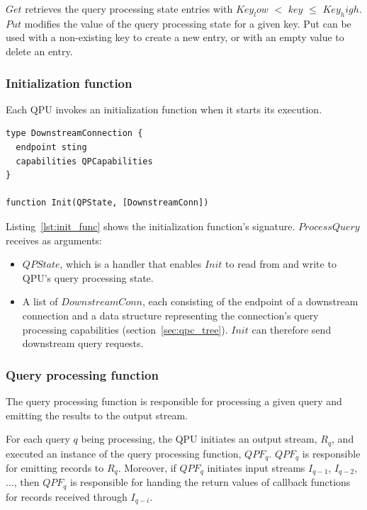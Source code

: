$Get$ retrieves the query processing state entries with $Key_low$ $<$ $key$ $\leq$ $Key_high$.
$Put$ modifies the value of the query processing state for a given key.
Put can be used with a non-existing key to create a new entry, or with an empty value to delete an entry.


\subsubsection{Initialization function}
\label{sec:initialization_func}

Each QPU invokes an initialization function when it starts its execution.

\begin{lstlisting}[caption={Initialization function signature},captionpos=b,label={lst:init_func}]
type DownstreamConnection {
  endpoint sting
  capabilities QPCapabilities
}

function Init(QPState, [DownstreamConn])
\end{lstlisting}

\noindent
Listing~\ref{lst:init_func} shows the initialization function's signature.
$ProcessQuery$ receives as arguments:
\begin{itemize}
  \item $QPState$, which is a handler that enables $Init$ to read from and write to QPU's query processing state.

  \item A list of $DownstreamConn$, each consisting of the endpoint of a downstream connection and a data structure
  representing the connection's query processing capabilities (section~\ref{sec:qpc_tree}).
  $Init$ can therefore send downstream query requests.
\end{itemize}


\subsubsection{Query processing function}
\label{sec:query_processing_func}

The query processing function is responsible for processing a given query and emitting the results to the output stream.

For each query $q$ being processing, the QPU initiates an output stream, $R_q$,
and executed an instance of the query processing function, $QPF_q$.
$QPF_q$ is responsible for emitting records to $R_q$.
Moreover, if $QPF_q$ initiates input streams $I_{q-1}$, $I_{q-2}$, ..., then $QPF_q$ is responsible for handing the return
values of callback functions for records received through $I_{q-i}$.

